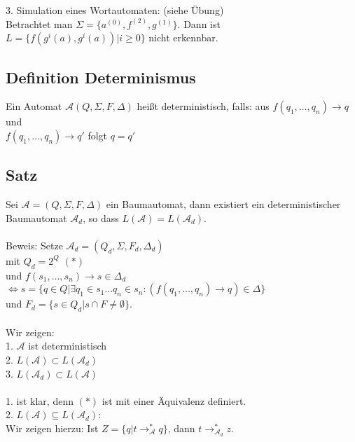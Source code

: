 \documentclass[titlepage]{article}
\begin{document}
3. Simulation eines Wortautomaten: (siehe \"Ubung)\\

Betrachtet man $\Sigma =\{a^{(0)}, f^{(2)}, g^{(1)}\}$. 
Dann ist $L = \{f(g^i(a), g^i(a)) | i \geq 0\}$ nicht erkennbar.

\subsection{Definition Determinismus}

Ein Automat $\mathcal{A} (Q, \Sigma,  F, \Delta)$ hei\ss t deterministisch, falls: aus
$ f(q_1, \dots, q_n) \rightarrow q $ und \\
$ f(q_1, \dots, q_n) \rightarrow q' $ folgt $ q = q'$

\subsection{Satz}

Sei $\mathcal{A} = (Q, \Sigma, F, \Delta)$ ein Baumautomat, dann existiert ein 
deterministischer Baumautomat $\mathcal{A}_d$, 
so dass $L(\mathcal{A}) = L(\mathcal{A}_d)$.\\ \\

Beweis: Setze $\mathcal{A}_d = (Q_d, \Sigma, F_d, \Delta_d)$ \\
mit $Q_d = 2^Q$ $(\ast)$\\
und $f(s_1, \dots, s_n) \rightarrow s \in \Delta_d$\\
$\Leftrightarrow s = \{ q \in Q | \exists q_1 \in s_1 \dots q_n \in s_n: 
(f(q_1, \dots, q_n) \rightarrow q) \in \Delta\}$ \\
und $F_d = \{ s \in Q_d | s \cap F \neq \emptyset\}$.\\ \\
Wir zeigen:\\
1. $\mathcal{A}$ ist deterministisch \\
2. $L(\mathcal{A}) \subset L(\mathcal{A}_d)$ \\
3. $L(\mathcal{A}_d) \subset L(\mathcal{A})$ \\ \\

1. ist klar, denn $(\ast)$ ist mit einer \"Aquivalenz definiert.\\
2. \glqq$L(\mathcal{A}) \subseteq L(\mathcal{A}_d)$\grqq:\\

Wir zeigen hierzu: Ist $Z = \{ q | t \rightarrow ^\ast_\mathcal{A} q\}$, 
dann $ t \rightarrow ^\ast_{\mathcal{A}_d} z$.\\ \\
\end{document}
